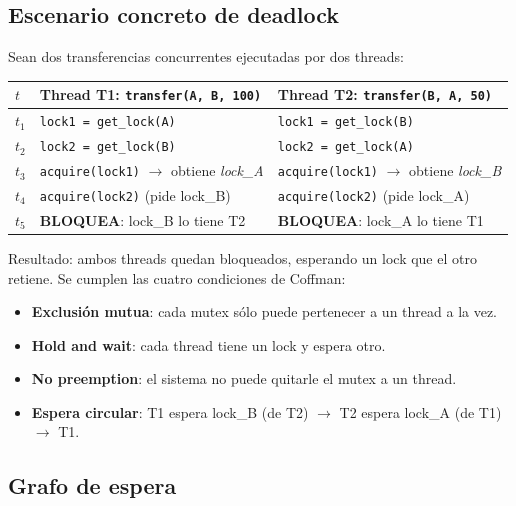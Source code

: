 \documentclass[11pt,a4paper]{article}
\begin{document}
\subsection*{Escenario concreto de deadlock}

Sean dos transferencias concurrentes ejecutadas por dos threads:

\begin{center}
\small
\begin{tabular}{@{}lp{6cm}p{6cm}@{}}
\toprule
$t$ & \textbf{Thread T1: \texttt{transfer(A, B, 100)}} & \textbf{Thread T2: \texttt{transfer(B, A, 50)}} \\
\midrule
$t_1$ & \texttt{lock1 = get\_lock(A)}   & \texttt{lock1 = get\_lock(B)} \\
$t_2$ & \texttt{lock2 = get\_lock(B)}   & \texttt{lock2 = get\_lock(A)} \\
$t_3$ & \texttt{acquire(lock1)} $\to$ obtiene \emph{lock\_A} & \texttt{acquire(lock1)} $\to$ obtiene \emph{lock\_B} \\
$t_4$ & \texttt{acquire(lock2)} (pide lock\_B) & \texttt{acquire(lock2)} (pide lock\_A) \\
$t_5$ & \textbf{BLOQUEA}: lock\_B lo tiene T2 & \textbf{BLOQUEA}: lock\_A lo tiene T1 \\
\bottomrule
\end{tabular}
\end{center}

Resultado: ambos threads quedan bloqueados, esperando un lock que
el otro retiene. Se cumplen las cuatro condiciones de Coffman:

\begin{itemize}[leftmargin=*,nosep]
    \item \textbf{Exclusión mutua}: cada mutex sólo puede pertenecer
        a un thread a la vez.
    \item \textbf{Hold and wait}: cada thread tiene un lock y espera
        otro.
    \item \textbf{No preemption}: el sistema no puede quitarle el
        mutex a un thread.
    \item \textbf{Espera circular}:
        T1 espera lock\_B (de T2) $\to$ T2 espera lock\_A (de T1)
        $\to$ T1.
\end{itemize}

\subsection*{Grafo de espera}
\end{document}
